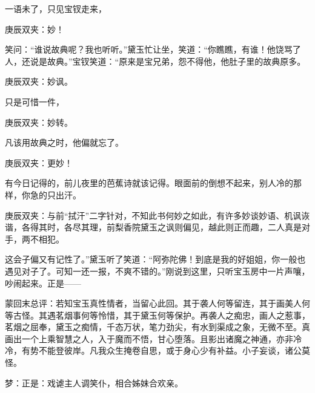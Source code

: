 \begin{parag}
    一语未了，只见宝钗走来，\begin{note}庚辰双夹：妙！\end{note}笑问：“谁说故典呢？我也听听。”黛玉忙让坐，笑道：“你瞧瞧，有谁！他饶骂了人，还说是故典。”宝钗笑道：“原来是宝兄弟，怨不得他，他肚子里的故典原多。\begin{note}庚辰双夹：妙讽。\end{note}只是可惜一件，\begin{note}庚辰双夹：妙转。\end{note}凡该用故典之时，他偏就忘了。\begin{note}庚辰双夹：更妙！\end{note}有今日记得的，前儿夜里的芭蕉诗就该记得。眼面前的倒想不起来，别人冷的那样，你急的只出汗。\begin{note}庚辰双夹：与前“拭汗”二字针对，不知此书何妙之如此，有许多妙谈妙语、机讽诙谐，各得其时，各尽其理，前梨香院黛玉之讽则偏见，越此则正而趣，二人真是对手，两不相犯。\end{note}这会子偏又有记性了。”黛玉听了笑道：“阿弥陀佛！到底是我的好姐姐，你一般也遇见对子了。可知一还一报，不爽不错的。”刚说到这里，只听宝玉房中一片声嚷，吵闹起来。正是——
\end{parag}


\begin{parag}
    \begin{note}蒙回末总评：若知宝玉真性情者，当留心此回。其于袭人何等留连，其于画美人何等古怪。其遇茗烟事何等怜惜，其于黛玉何等保护。再袭人之痴忠，画人之惹事，茗烟之屈奉，黛玉之痴情，千态万状，笔力劲尖，有水到渠成之象，无微不至。真画出一个上乘智慧之人，入于魔而不悟，甘心堕落。且影出诸魔之神通，亦非冷冷，有势不能登彼岸。凡我众生掩卷自思，或于身心少有补益。小子妄谈，诸公莫怪。\end{note}
\end{parag}


\begin{parag}
    \begin{note}梦：正是：戏谑主人调笑仆，相合姊妹合欢亲。\end{note}
\end{parag}
